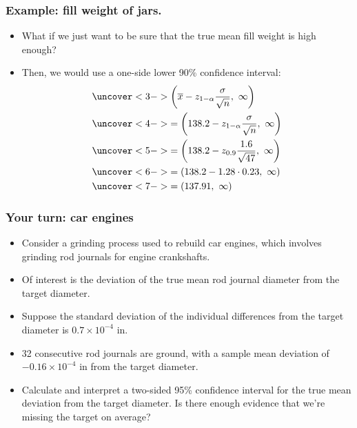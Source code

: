 \documentclass[handout]{beamer}\usepackage[]{graphicx}\usepackage[]{color}
\providecommand{\ov}[1]{\overline{#1}}
\numberwithin{equation}{section}
\begin{document}
\begin{frame}
\frametitle{Example: fill weight of jars. }

\begin{itemize}
\item What if we just want to be sure that the true mean fill weight is high enough? 
\pause \item Then, we would use a one-side lower 90\% confidence interval:
\begin{align*}
& \uncover<3->{ \left (\ov{x}  - z_{1 - \alpha} \frac{\sigma}{\sqrt{n}}, \ \infty \right)} \\
& \uncover<4->{= \left (138.2 - z_{1 - \alpha} \frac{\sigma}{\sqrt{n}}, \ \infty \right)} \\
&\uncover<5->{= \left (138.2 - z_{0.9} \frac{1.6}{\sqrt{47}}, \ \infty \right)} \\
&\uncover<6->{= (138.2 - 1.28 \cdot 0.23, \ \infty)} \\
& \uncover<7->{= (137.91, \ \infty)}
\end{align*}
\end{itemize}
\end{frame}

\begin{frame}
\frametitle{Your turn: car engines}
\begin{itemize}
\item Consider a grinding process used to rebuild car engines, which involves grinding rod journals for engine crankshafts. 
\pause \item Of interest is the deviation of the true mean rod journal diameter from the target diameter.
\pause \item Suppose the standard deviation of the individual differences from the target diameter is $0.7 \times 10^{-4}$ in.
\pause \item 32 consecutive rod journals are ground, with a sample mean deviation of $-0.16 \times 10^{-4}$ in from the target diameter.
\pause \item Calculate and interpret a two-sided 95\% confidence interval for the true mean deviation from the target diameter. Is there enough evidence that we're missing the target on average?
\end{itemize}
\end{frame}
\end{document}
